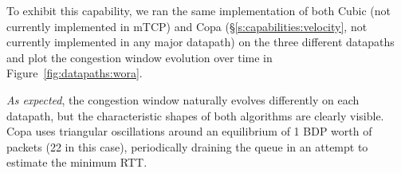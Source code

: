 To exhibit this capability, we ran the same implementation of both Cubic (not currently implemented in mTCP) and Copa (\S\ref{s:capabilities:velocity}, not currently implemented in any major datapath) on the three different datapaths and plot the congestion window evolution over time in Figure~\ref{fig:datapaths:wora}.

\textit{As expected}, the congestion window naturally evolves differently on each datapath, but the characteristic shapes of both algorithms are clearly visible. Copa uses triangular oscillations around an equilibrium of 1 BDP worth of packets (22 in this case), periodically draining the queue in an attempt to estimate the minimum RTT.



%
%
%
%
%
